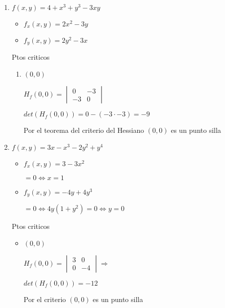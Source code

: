 \documentclass[../practica_06.tex]{subfiles}
\begin{document}
    \begin{enumerate}
        \item $f(x,y) = 4 + x^3 + y^3 - 3xy$

            \begin{itemize}
                \item $f_x(x,y) = 2x^2 - 3y$
                \item $f_y(x,y) = 2y^2 - 3x$
            \end{itemize}

            Ptos criticos \begin{enumerate}
                \item $(0,0)$
                    
                    $ H_f(0,0) = \begin{vmatrix}
                        0 & -3\\
                        -3 & 0
                    \end{vmatrix} $

                    $det(H_f(0,0)) = 0 - (-3 \cdot -3) = -9$

                    Por el teorema del criterio del Hessiano $(0,0)$ es un punto silla

            \end{enumerate}

        \item $f(x,y) = 3x - x^3 - 2y^2 + y^4$
        
            \begin{itemize}
                \item $f_x(x,y) = 3 - 3x^2$
                
                    $ = 0 \Leftrightarrow x = 1$

                \item $f_y(x,y) = -4y + 4y^3$

                    $ = 0 \Leftrightarrow 4y(1 + y^2) = 0 \Leftrightarrow y = 0$

            \end{itemize}

            Ptos criticos \begin{itemize}
                \item $(0,0)$

                    $ H_f(0,0) = \begin{vmatrix}
                        3 & 0 \\
                        0 & -4
                    \end{vmatrix} \Rightarrow$

                    $ det(H_f(0,0)) = -12 $

                    Por el criterio $(0,0)$ es un punto silla

            \end{itemize}

    \end{enumerate}
\end{document}
